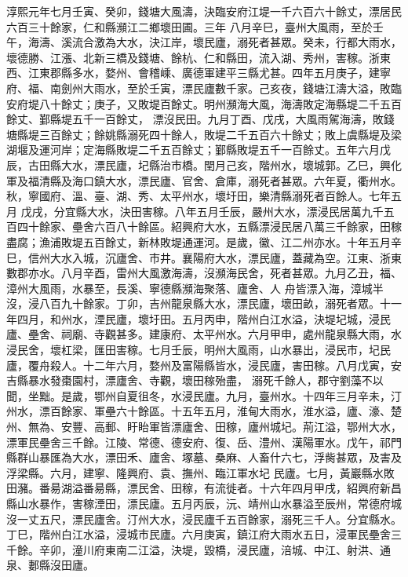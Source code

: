 \begin{pinyinscope}
 淳熙元年七月壬寅、癸卯，錢塘大風濤，決臨安府江堤一千六百六十餘丈，漂居民六百三十餘家，仁和縣瀕江二鄉壞田圃。三年
 八月辛巳，臺州大風雨，至於壬午，海濤、溪流合激為大水，決江岸，壞民廬，溺死者甚眾。癸未，行都大雨水，壞德勝、江漲、北新三橋及錢塘、餘杭、仁和縣田，流入湖、秀州，害稼。浙東西、江東郡縣多水，婺州、會稽嵊、廣德軍建平三縣尤甚。四年五月庚子，建寧府、福、南劍州大雨水，至於壬寅，漂民廬數千家。己亥夜，錢塘江濤大溢，敗臨安府堤八十餘丈；庚子，又敗堤百餘丈。明州瀕海大風，海濤敗定海縣堤二千五百餘丈、鄞縣堤五千一百餘丈，
 漂沒民田。九月丁酉、戊戌，大風雨駕海濤，敗錢塘縣堤三百餘丈；餘姚縣溺死四十餘人，敗堤二千五百六十餘丈；敗上虞縣堤及梁湖堰及運河岸；定海縣敗堤二千五百餘丈；鄞縣敗堤五千一百餘丈。五年六月戊辰，古田縣大水，漂民廬，圮縣治市橋。閏月己亥，階州水，壞城郭。乙巳，興化軍及福清縣及海口鎮大水，漂民廬、官舍、倉庫，溺死者甚眾。六年夏，衢州水。秋，寧國府、溫、臺、湖、秀、太平州水，壞圩田，樂清縣溺死者百餘人。七年五月
 戊戌，分宜縣大水，決田害稼。八年五月壬辰，嚴州大水，漂浸民居萬九千五百四十餘家、壘舍六百八十餘區。紹興府大水，五縣漂浸民居八萬三千餘家，田稼盡腐；漁浦敗堤五百餘丈，新林敗堤通運河。是歲，徽、江二州亦水。十年五月辛巳，信州大水入城，沉廬舍、市井。襄陽府大水，漂民廬，蓋藏為空。江東、浙東數郡亦水。八月辛酉，雷州大風激海濤，沒瀕海民舍，死者甚眾。九月乙丑，福、漳州大風雨，水暴至，長溪、寧德縣瀕海聚落、廬舍、人
 舟皆漂入海，漳城半沒，浸八百九十餘家。丁卯，吉州龍泉縣大水，漂民廬，壞田畝，溺死者眾。十一年四月，和州水，湮民廬，壞圩田。五月丙申，階州白江水溢，決堤圮城，浸民廬、壘舍、祠廟、寺觀甚多。建康府、太平州水。六月甲申，處州龍泉縣大雨，水浸民舍，壞杠梁，匯田害稼。七月壬辰，明州大風雨，山水暴出，浸民市，圮民廬，覆舟殺人。十二年六月，婺州及富陽縣皆水，浸民廬，害田稼。八月戊寅，安吉縣暴水發棗園村，漂廬舍、寺觀，壞田稼殆盡，
 溺死千餘人，郡守劉藻不以聞，坐黜。是歲，鄂州自夏徂冬，水浸民廬。九月，臺州水。十四年三月辛未，汀州水，漂百餘家、軍壘六十餘區。十五年五月，淮甸大雨水，淮水溢，廬、濠、楚州、無為、安豐、高郵、盱眙軍皆漂廬舍、田稼，廬州城圮。荊江溢，鄂州大水，漂軍民壘舍三千餘。江陵、常德、德安府、復、岳、澧州、漢陽軍水。戊午，祁門縣群山暴匯為大水，漂田禾、廬舍、塚墓、桑麻、人畜什六七，浮胔甚眾，及害及浮梁縣。六月，建寧、隆興府、袁、撫州、臨江軍水圮
 民廬。七月，黃巖縣水敗田瀦。番昜湖溢番昜縣，漂民舍、田稼，有流徙者。十六年四月甲戌，紹興府新昌縣山水暴作，害稼湮田，漂民廬。五月丙辰，沅、靖州山水暴溢至辰州，常德府城沒一丈五尺，漂民廬舍。汀州大水，浸民廬千五百餘家，溺死三千人。分宜縣水。丁巳，階州白江水溢，浸城市民廬。六月庚寅，鎮江府大雨水五日，浸軍民壘舍三千餘。辛卯，潼川府東南二江溢，決堤，毀橋，浸民廬，涪城、中江、射洪、通泉、郪縣沒田廬。




\end{pinyinscope}
